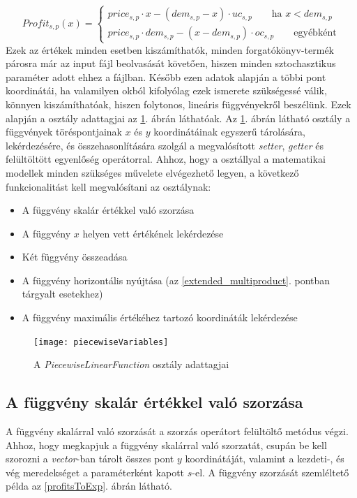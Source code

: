 \begin{equation*}
Profit_{s,p}(x)= \begin{cases}
            price_{s,p}\cdot x-(dem_{s,p}-x) \cdot uc_{s,p}\qquad \text{ha } x<dem_{s,p} \\
            price_{s,p} \cdot dem_{s,p}-(x-dem_{s,p}) \cdot oc_{s,p}\qquad \text{egyébként}
       \end{cases}
\end{equation*}
Ezek az értékek minden esetben kiszámíthatók, minden forgatókönyv-termék párosra már az input fájl beolvasását követően, hiszen minden sztochasztikus paraméter adott ehhez a fájlban.
Később ezen adatok alapján a többi pont koordinátái, ha valamilyen okból kifolyólag ezek ismerete szükségessé válik, könnyen kiszámíthatóak, hiszen folytonos, lineáris függvényekről beszélünk.
Ezek alapján a  osztály adattagjai az \ref{piecewise_variables}. ábrán láthatóak.
Az \ref{piecewise_variables}. ábrán látható  osztály a függvények töréspontjainak $x$ és $y$ koordinátáinak egyszerű tárolására, lekérdezésére, és összehasonlítására szolgál a megvalósított \textit{setter}, \textit{getter} és felültöltött egyenlőség operátorral.
Ahhoz, hogy a  osztállyal a matematikai modellek minden szükséges művelete elvégezhető legyen, a következő funkcionalitást kell megvalósítani az osztálynak:
\begin{itemize}
\item A függvény skalár értékkel való szorzása
\item A függvény $x$ helyen vett értékének lekérdezése
\item Két függvény összeadása
\item A függvény horizontális nyújtása (az \ref{extended_multiproduct}. pontban tárgyalt esetekhez)
\item A függvény maximális értékéhez tartozó koordináták lekérdezése
\end{itemize}
\begin{figure}[H]
\begin{center}
\texttt{[image: piecewiseVariables]}
\caption{A \textit{PiecewiseLinearFunction} osztály adattagjai}
\label{piecewise_variables}
\end{center}
\end{figure}  
\subsection{A függvény skalár értékkel való szorzása} \label{multiplyByScalar}
A függvény skalárral való szorzását a szorzás operátort felültöltő metódus végzi.
Ahhoz, hogy megkapjuk a függvény skalárral való szorzatát, csupán be kell szorozni a \textit{vector}-ban tárolt összes pont $y$ koordinátáját, valamint a kezdeti-, és vég meredekséget a paraméterként kapott $s$-el.
A függvény szorzását szemléltető példa az \ref{profitsToExp}. ábrán látható.
